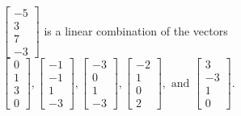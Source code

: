 \begin{exercise}
\begin{exerciseStatement}
  \end{exerciseStatement}
  \begin{exerciseAnswer}
   \(\left[\begin{array}{c}
-5 \\
3 \\
7 \\
-3
\end{array}\right]\) 
  	 is  
	a linear combination of the vectors \(\left[\begin{array}{c}
0 \\
1 \\
3 \\
0
\end{array}\right] , \left[\begin{array}{c}
-1 \\
-1 \\
1 \\
-3
\end{array}\right] , \left[\begin{array}{c}
-3 \\
0 \\
1 \\
-3
\end{array}\right] , \left[\begin{array}{c}
-2 \\
1 \\
0 \\
2
\end{array}\right] , \text{ and } \left[\begin{array}{c}
3 \\
-3 \\
1 \\
0
\end{array}\right]\).

	
  


  \end{exerciseAnswer}
\end{exercise}